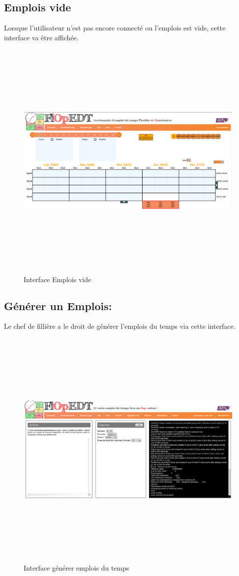 \subsection*{Emplois vide}
Lorsque l'utilisateur n'est pas encore connecté ou l'emplois est vide, cette interface va être affichée.
\begin{figure}[H]
      \centering
        \includegraphics[width=15cm,height=12cm]{img/3.png}
        \caption{Interface Emplois vide}
\end{figure}
\newpage
\subsection*{Générer un Emplois:}
Le chef de fillière a le droit de générer l'emplois du temps via cette interface.
\begin{figure}[H]
      \centering
        \includegraphics[width=15cm,height=12cm]{img/4.png}
        \caption{Interface générer emplois du temps}
\end{figure}
\newpage

